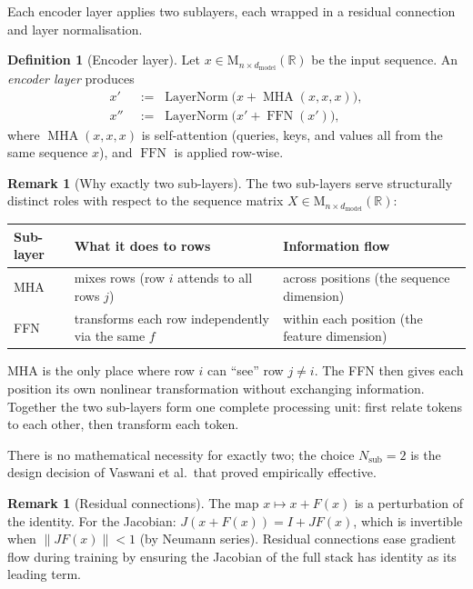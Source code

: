 \documentclass[11pt]{amsart}
\theoremstyle{plain}
\theoremstyle{definition}
\newtheorem{definition}[theorem]{Definition}
\newtheorem{remark}[theorem]{Remark}
\newcommand{\R}{\mathbb{R}}
\newcommand{\Mat}[2]{\mathrm{M}_{#1 \times #2}(\R)}
\newcommand{\MHA}{\operatorname{MHA}}
\newcommand{\LayerNorm}{\operatorname{LayerNorm}}
\newcommand{\FFN}{\operatorname{FFN}}
\begin{document}
Each encoder layer applies two sublayers, each wrapped in a residual connection
and layer normalisation.

\begin{definition}[Encoder layer]
Let $x \in \Mat{n}{d_{\mathrm{model}}}$ be the input sequence.  An
\emph{encoder layer} produces
\begin{align*}
    x' &\;:=\; \LayerNorm\bigl(x + \MHA(x, x, x)\bigr), \\
    x'' &\;:=\; \LayerNorm\bigl(x' + \FFN(x')\bigr),
\end{align*}
where $\MHA(x,x,x)$ is self-attention (queries, keys, and values all from the
same sequence $x$), and $\FFN$ is applied row-wise.
\end{definition}

\begin{remark}[Why exactly two sub-layers]
\label{rem:two-sublayers}
The two sub-layers serve structurally distinct roles with respect to the sequence
matrix $X \in \Mat{n}{d_{\mathrm{model}}}$:
\begin{center}
\renewcommand{\arraystretch}{1.3}
\begin{tabular}{lp{4.5cm}p{5cm}}
\hline
Sub-layer & What it does to rows & Information flow \\
\hline
MHA & mixes rows (row $i$ attends to all rows $j$) & across positions (the sequence dimension) \\
FFN & transforms each row independently via the same $f$ & within each position (the feature dimension) \\
\hline
\end{tabular}
\end{center}
MHA is the only place where row $i$ can ``see'' row $j \neq i$.  The FFN then
gives each position its own nonlinear transformation without exchanging
information.  Together the two sub-layers form one complete processing unit:
first relate tokens to each other, then transform each token.

There is no mathematical necessity for exactly two; the choice $N_{\text{sub}} = 2$
is the design decision of Vaswani et al.\ that proved empirically effective.
\end{remark}

\begin{remark}[Residual connections]
The map $x \mapsto x + F(x)$ is a perturbation of the identity.  For the
Jacobian: $J(x + F(x)) = I + JF(x)$, which is invertible when $\|JF(x)\| < 1$
(by Neumann series).  Residual connections ease gradient flow during training
by ensuring the Jacobian of the full stack has identity as its leading term.
\end{remark}
\end{document}

